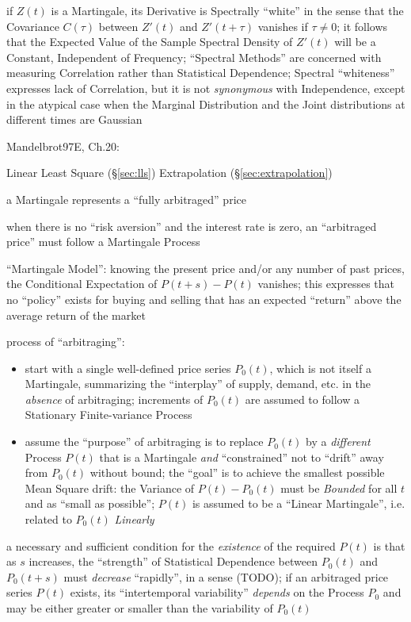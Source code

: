 if $Z(t)$ is a Martingale, its Derivative is Spectrally ``white'' in the sense
that the Covariance $C(\tau)$ between $Z'(t)$ and $Z'(t + \tau)$ vanishes if
$\tau \neq 0$; it follows that the Expected Value of the Sample Spectral Density
of $Z'(t)$ will be a Constant, Independent of Frequency;
``Spectral Methods'' are concerned with measuring Correlation rather than
Statistical Dependence; Spectral ``whiteness'' expresses lack of Correlation,
but it is not \emph{synonymous} with Independence, except in the atypical case
when the Marginal Distribution and the Joint distributions at different times
are Gaussian

Mandelbrot97E, Ch.20:

Linear Least Square (\S\ref{sec:lls}) Extrapolation (\S\ref{sec:extrapolation})

a Martingale represents a ``fully arbitraged'' price

when there is no ``risk aversion'' and the interest rate is zero, an
``arbitraged price'' must follow a Martingale Process

``Martingale Model'': knowing the present price and/or any number of past
prices, the Conditional Expectation of $P(t+s) - P(t)$ vanishes; this expresses
that no ``policy'' exists for buying and selling that has an expected ``return''
above the average return of the market

process of ``arbitraging'':
\begin{itemize}
  \item start with a single well-defined price series $P_0(t)$, which is not
    itself a Martingale, summarizing the ``interplay'' of supply, demand, etc.
    in the \emph{absence} of arbitraging; increments of $P_0(t)$ are assumed to
    follow a Stationary Finite-variance Process
  \item assume the ``purpose'' of arbitraging is to replace $P_0(t)$ by a
    \emph{different} Process $P(t)$ that is a Martingale \emph{and}
    ``constrained'' not to ``drift'' away from $P_0(t)$ without bound;
    the ``goal'' is to achieve the smallest possible Mean Square drift: the
    Variance of $P(t) - P_0(t)$ must be \emph{Bounded} for all $t$ and as
    ``small as possible''; $P(t)$ is assumed to be a ``Linear Martingale'',
    i.e. related to $P_0(t)$ \emph{Linearly}
\end{itemize}

a necessary and sufficient condition for the \emph{existence} of the required
$P(t)$ is that as $s$ increases, the ``strength'' of Statistical Dependence
between $P_0(t)$ and $P_0(t+s)$ must \emph{decrease} ``rapidly'', in a sense
(TODO); if an arbitraged price series $P(t)$ exists, its ``intertemporal
variability'' \emph{depends} on the Process $P_0$ and may be either greater or
smaller than the variability of $P_0(t)$

